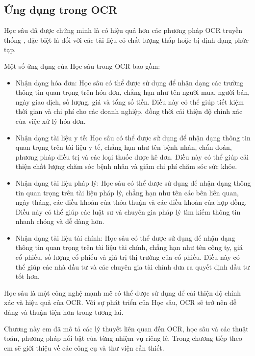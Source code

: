 \subsection{Ứng dụng trong OCR}
Học sâu đã được chứng minh là có hiệu quả hơn các phương pháp OCR truyền thống \cite{ai-vs-traditional}, đặc biệt là đối với các tài liệu có chất lượng thấp hoặc bị định dạng phức tạp.

Một số ứng dụng của Học sâu trong OCR bao gồm:
\begin{itemize}
    \item Nhận dạng hóa đơn: Học sâu có thể được sử dụng để nhận dạng các trường thông tin quan trọng trên hóa đơn, chẳng hạn như tên người mua, người bán, ngày giao dịch, số lượng, giá và tổng số tiền. Điều này có thể giúp tiết kiệm thời gian và chi phí cho các doanh nghiệp, đồng thời cải thiện độ chính xác của việc xử lý hóa đơn.
    \item Nhận dạng tài liệu y tế: Học sâu có thể được sử dụng để nhận dạng thông tin quan trọng trên tài liệu y tế, chẳng hạn như tên bệnh nhân, chẩn đoán, phương pháp điều trị và các loại thuốc được kê đơn. Điều này có thể giúp cải thiện chất lượng chăm sóc bệnh nhân và giảm chi phí chăm sóc sức khỏe.
    \item Nhận dạng tài liệu pháp lý: Học sâu có thể được sử dụng để nhận dạng thông tin quan trọng trên tài liệu pháp lý, chẳng hạn như tên các bên liên quan, ngày tháng, các điều khoản của thỏa thuận và các điều khoản của hợp đồng. Điều này có thể giúp các luật sư và chuyên gia pháp lý tìm kiếm thông tin nhanh chóng và dễ dàng hơn.
    \item Nhận dạng tài liệu tài chính: Học sâu có thể được sử dụng để nhận dạng thông tin quan trọng trên tài liệu tài chính, chẳng hạn như tên công ty, giá cổ phiếu, số lượng cổ phiếu và giá trị thị trường của cổ phiếu. Điều này có thể giúp các nhà đầu tư và các chuyên gia tài chính đưa ra quyết định đầu tư tốt hơn.
\end{itemize}
Học sâu là một công nghệ mạnh mẽ có thể được sử dụng để cải thiện độ chính xác và hiệu quả của OCR. Với sự phát triển của Học sâu, OCR sẽ trở nên dễ dàng và thuận tiện hơn trong tương lai.

Chương này em đã mô tả các lý thuyết liên quan đến OCR, học sâu và các thuật toán, phương pháp nổi bật của từng nhiệm vụ riêng lẻ. Trong chương tiếp theo em sẽ giới thiệu về các công cụ và thư viện cần thiết.
